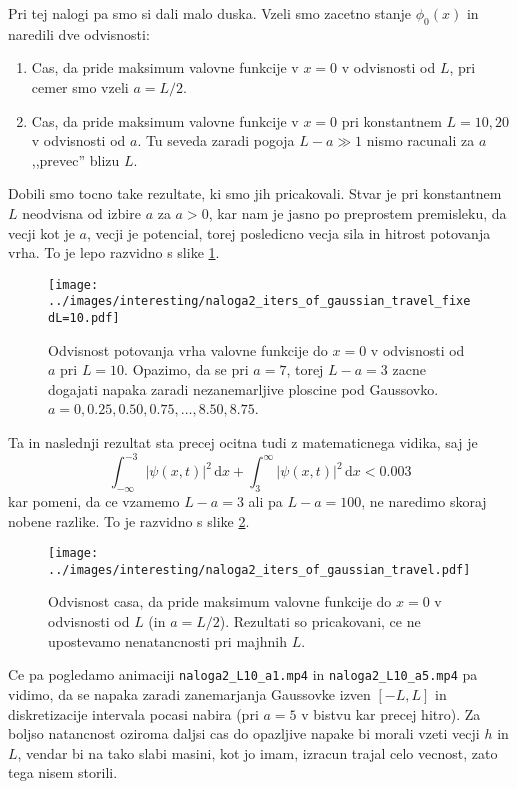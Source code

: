 \documentclass[11pt, a4paper]{article}
\begin{document}
    Pri tej nalogi pa smo si dali malo duska. Vzeli smo zacetno stanje $\phi_0(x)$ in naredili dve odvisnosti:
    \begin{enumerate}
        \item Cas, da pride maksimum valovne funkcije v $x = 0$ v odvisnosti od $L$, pri cemer smo vzeli $a = L/2$.
        \item Cas, da pride maksimum valovne funkcije v $x = 0$ pri konstantnem $L=10,20$ v odvisnosti od $a$. Tu seveda zaradi pogoja $L-a \gg 1$ nismo racunali za $a$ ,,prevec'' blizu $L$.
    \end{enumerate}
    Dobili smo tocno take rezultate, ki smo jih pricakovali. Stvar je pri konstantnem $L$ neodvisna od izbire $a$ za $a > 0$, kar nam je jasno
    po preprostem premisleku, da vecji kot je $a$, vecji je potencial, torej posledicno vecja sila in hitrost potovanja vrha.
    To je lepo razvidno s slike \ref{fig:naloga2_a}.

    \begin{figure}
        \centering
        \texttt{[image: ../images/interesting/naloga2\_iters\_of\_gaussian\_travel\_fixedL=10.pdf]}
        \caption{Odvisnost potovanja vrha valovne funkcije do $x=0$ v odvisnosti od $a$ pri $L=10$. Opazimo, da se pri $a=7$,
        torej $L-a = 3$ zacne dogajati napaka zaradi nezanemarljive ploscine pod Gaussovko. $a = 0, 0.25, 0.50, 0.75, \dotsc, 8.50,8.75$.}
        \label{fig:naloga2_a}
    \end{figure}

    Ta in naslednji rezultat sta precej ocitna tudi z matematicnega vidika, saj je $$\int_{-\infty}^{-3} |\psi(x,t)|^2\, \text{d}x + \int_3^{\infty} |\psi(x,t)|^2\, \text{d}x < 0.003$$
    kar pomeni, da ce vzamemo $L-a=3$ ali pa $L-a=100$, ne naredimo skoraj nobene razlike. To je razvidno s slike \ref{fig:naloga2_L}.

    \begin{figure}
        \centering
        \texttt{[image: ../images/interesting/naloga2\_iters\_of\_gaussian\_travel.pdf]}
        \caption{Odvisnost casa, da pride maksimum valovne funkcije do $x=0$ v odvisnosti od $L$ (in $a=L/2$). Rezultati so pricakovani,
        ce ne upostevamo nenatancnosti pri majhnih $L$.}
        \label{fig:naloga2_L}
    \end{figure}

    Ce pa pogledamo animaciji \texttt{naloga2\_L10\_a1.mp4} in \texttt{naloga2\_L10\_a5.mp4} pa vidimo, da se napaka zaradi
    zanemarjanja Gaussovke izven $[-L, L]$ in diskretizacije intervala pocasi nabira (pri $a=5$ v bistvu kar precej hitro). Za boljso natancnost oziroma
    daljsi cas do opazljive napake bi morali vzeti vecji $h$ in $L$, vendar bi na tako slabi masini, kot jo imam, izracun trajal
    celo vecnost, zato tega nisem storili.
\end{document}
